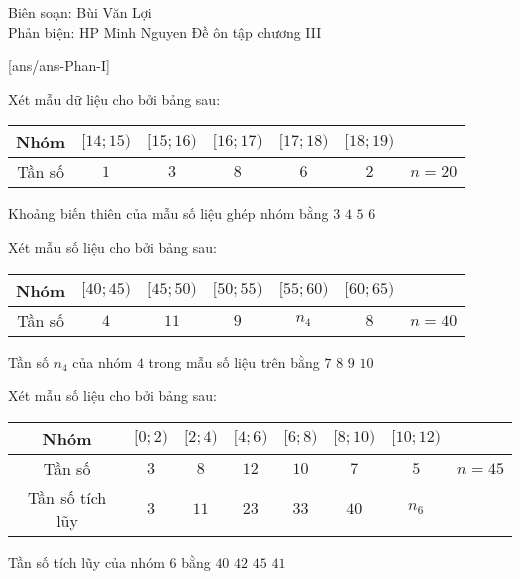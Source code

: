 ﻿\begin{name}
 {Biên soạn: Bùi Văn Lợi \\ Phản biện: HP Minh Nguyen}
 {Đề ôn tập chương III}
\end{name}

\TN
{}[ans/ans\currfilebase-Phan-I]

\begin{ex}%
Xét mẫu dữ liệu cho bởi bảng sau:
\begin{center}
\begin{tabular}{|c|c|c|c|c|c|c|}
\hline 
Nhóm & $[14;15)$ & $[15;16)$ & $[16;17)$ & $[17;18)$ & $[18;19)$ & \\ 
\hline 
Tần số & $1$ & $3$ & $8$ & $6$ & $2$ & $n=20$ \\ 
\hline 
\end{tabular} 
\end{center}
Khoảng biến thiên của mẫu số liệu ghép nhóm bằng
\choice
{$3$}
{$4$}
{\True $5$}
{$6$}

\end{ex}

\begin{ex}%
Xét mẫu số liệu cho bởi bảng sau:
\begin{center}
\begin{tabular}{|c|c|c|c|c|c|c|}
\hline
Nhóm & $[40;45)$ & $[45;50)$ & $[50;55)$ & $[55;60)$ & $[60;65)$ & \\
\hline
Tần số & $4$ & $11$ & $9$ & $n_4$ & $8$ & $n=40$ \\
\hline
\end{tabular}
\end{center}
Tần số $n_4$ của nhóm $4$ trong mẫu số liệu trên bằng
\choice
{$7$}
{\True $8$}
{$9$}
{$10$}

\end{ex}

\begin{ex}%
Xét mẫu số liệu cho bởi bảng sau:
\begin{center}
\begin{tabular}{|c|c|c|c|c|c|c|c|}
\hline
Nhóm & $[0;2)$ & $[2;4)$ & $[4;6)$ & $[6;8)$ & $[8;10)$ & $[10;12)$ &\\
\hline
Tần số & $3$ & $8$ & $12$ & $10$ & $7$ & $5$ & $n=45$\\
\hline
Tần số tích lũy & $3$ & $11$ & $23$ & $33$ & $40$ & $n_6$ &\\
\hline
\end{tabular}
\end{center}
Tần số tích lũy của nhóm $6$ bằng
\choice
{$40$}
{$42$}
{\True $45$}
{$41$}

\end{ex}

